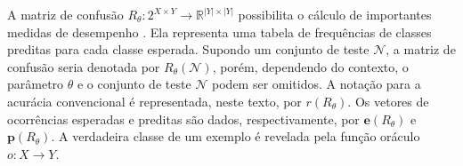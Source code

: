 A matriz de confusão $R_{\theta}\colon 2^{X \times Y} \rightarrow \mathbb{R}^{|Y|\times|Y|}$ possibilita o cálculo de importantes medidas de desempenho \cite{stehman1997selecting}.
Ela representa uma tabela de frequências de classes preditas para cada classe esperada.
Supondo um conjunto de teste $\mathcal{N}$, a matriz de confusão seria denotada por  $R_{\theta}(\mathcal{N})$, porém, dependendo do contexto, o parâmetro $\theta$ e o conjunto de teste $\mathcal{N}$ podem ser omitidos.
A notação para a acurácia convencional é representada, neste texto, por $r(R_{\theta})$.
Os vetores de ocorrências esperadas e preditas são dados, respectivamente, por $\bm{e}(R_{\theta})$ e $\bm{p}(R_{\theta})$.
A verdadeira classe de um exemplo é revelada pela função oráculo $o\colon X \rightarrow Y$.

